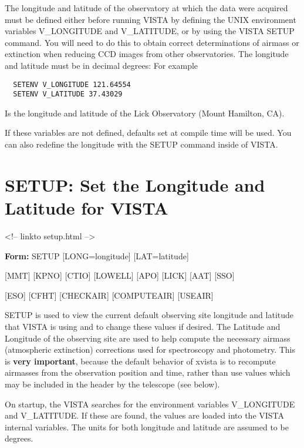 The longitude and latitude of the observatory at which the data were
acquired must be defined either before running VISTA by defining the UNIX
environment variables V\_LONGITUDE and V\_LATITUDE, or by using the VISTA
SETUP command.  You will need to do this to obtain correct determinations of
airmass or extinction when reducing CCD images from other observatories.
The longitude and latitude must be in decimal degrees: For example
\begin{verbatim}
  SETENV V_LONGITUDE 121.64554
  SETENV V_LATITUDE 37.43029
\end{verbatim}
Is the longitude and latitude of the Lick Observatory (Mount Hamilton, CA).

If these variables are not defined, defaults set at compile time will be
used.  You can also redefine the longitude with the SETUP command inside of
VISTA.

\section{SETUP: Set the Longitude and Latitude for VISTA}
\begin{rawhtml}
<!-- linkto setup.html -->
\end{rawhtml}

\begin{command}
  \item[\textbf{Form: } SETUP {[LONG=longitude]} {[LAT=latitude]}\hfill]{}
  \item{{[MMT]} {[KPNO]} {[CTIO]} {[LOWELL]} {[APO]} {[LICK]} {[AAT]} {[SSO]}}
  \item{{[ESO]} {[CFHT]} {[CHECKAIR]} {[COMPUTEAIR]} {[USEAIR]}} 
\end{command}

SETUP is used to view the current default observing site longitude and
latitude that VISTA is using and to change these values if desired.  The
Latitude and Longitude of the observing site are used to help compute the
necessary airmass (atmospheric extinction) corrections used for
spectroscopy and photometry. This is \textbf{very important}, because
the default behavior of xvista is to recompute airmasses from the observation
position and time, rather than use values which may be included in the header 
by the telescope (see below).

On startup, the VISTA searches for the environment variables V\_LONGITUDE
and V\_LATITUDE.  If these are found, the values are loaded into the VISTA
internal variables.  The units for both longitude and latitude are assumed
to be degrees.


